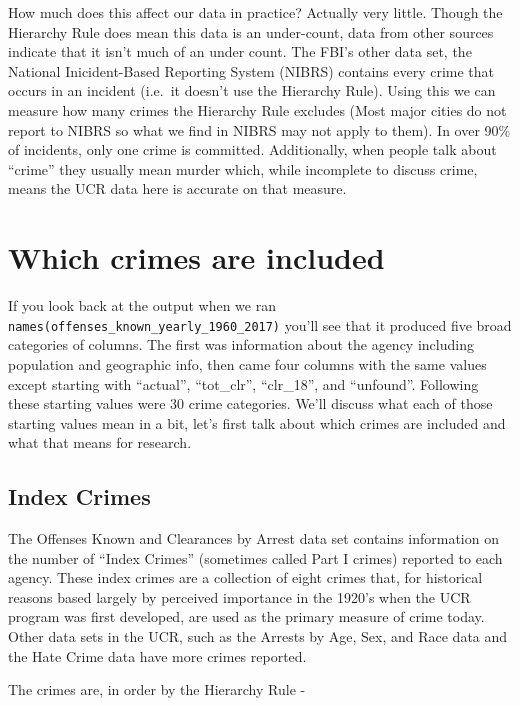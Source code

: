 \documentclass[
  12pt,
]{book}
\begin{document}
How much does this affect our data in practice? Actually very little. Though the Hierarchy Rule does mean this data is an under-count, data from other sources indicate that it isn't much of an under count. The FBI's other data set, the National Inicident-Based Reporting System (NIBRS) contains every crime that occurs in an incident (i.e.~it doesn't use the Hierarchy Rule). Using this we can measure how many crimes the Hierarchy Rule excludes (Most major cities do not report to NIBRS so what we find in NIBRS may not apply to them). In over 90\% of incidents, only one crime is committed. Additionally, when people talk about ``crime'' they usually mean murder which, while incomplete to discuss crime, means the UCR data here is accurate on that measure.

\hypertarget{which-crimes-are-included}{%
\section{Which crimes are included}\label{which-crimes-are-included}}

If you look back at the output when we ran \texttt{names(offenses\_known\_yearly\_1960\_2017)} you'll see that it produced five broad categories of columns. The first was information about the agency including population and geographic info, then came four columns with the same values except starting with ``actual'', ``tot\_clr'', ``clr\_18'', and ``unfound''. Following these starting values were 30 crime categories. We'll discuss what each of those starting values mean in a bit, let's first talk about which crimes are included and what that means for research.

\hypertarget{index-crimes}{%
\subsection{Index Crimes}\label{index-crimes}}

The Offenses Known and Clearances by Arrest data set contains information on the number of ``Index Crimes'' (sometimes called Part I crimes) reported to each agency. These index crimes are a collection of eight crimes that, for historical reasons based largely by perceived importance in the 1920's when the UCR program was first developed, are used as the primary measure of crime today. Other data sets in the UCR, such as the Arrests by Age, Sex, and Race data and the Hate Crime data have more crimes reported.

The crimes are, in order by the Hierarchy Rule -
\end{document}
